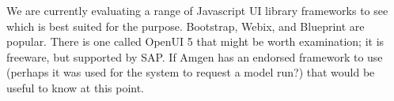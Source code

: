 \documentclass[11pt]{tsmemo}
\begin{document}
\begin{memo}
We are currently evaluating a range of Javascript UI library
frameworks to see which is best suited for the purpose.
Bootstrap, Webix, and Blueprint are popular.  There is one called
OpenUI 5 that might be worth examination; it is freeware, but
supported by SAP.  If Amgen has an endorsed framework to use (perhaps
it was used for the system to request a model run?) that
would be useful to know at this point.



\end{memo}
\end{document}
